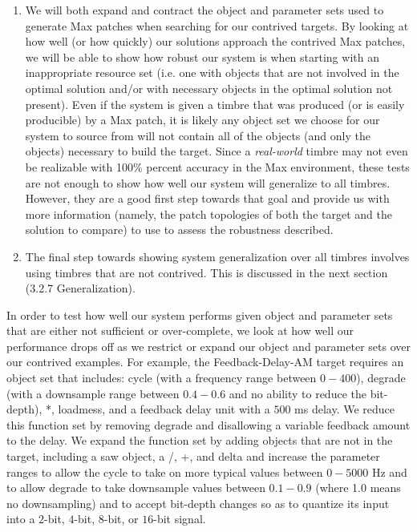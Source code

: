 \documentclass[a4paper,12pt]{report} 	%
\numberwithin{figure}{chapter}
\numberwithin{table}{chapter}
\numberwithin{equation}{chapter}
\begin{document}
\begin{flushleft}
\begin{enumerate}
\item We will both expand and contract the object and parameter sets used to generate Max patches when searching for our contrived targets. By looking at how well (or how quickly) our solutions approach the contrived Max patches, we will be able to show how robust our system is when starting with an inappropriate resource set (i.e. one with objects that are not involved in the optimal solution and/or with necessary objects in the optimal solution not present). Even if the system is given a timbre that was produced (or is easily producible) by a Max patch, it is likely any object set we choose for our system to source from will not contain all of the objects (and only the objects) necessary to build the target. Since a \emph{real-world} timbre may not even be realizable with 100\% percent accuracy in the Max environment, these tests are not enough to show how well our system will generalize to all timbres. However, they are a good first step towards that goal and provide us with more information (namely, the patch topologies of both the target and the solution to compare) to use to assess the robustness described.
\item The final step towards showing system generalization over all timbres involves using timbres that are not contrived. This is discussed in the next section (3.2.7 Generalization).
\end{enumerate}

In order to test how well our system performs given object and parameter sets that are either not sufficient or over-complete, we look at how well our performance drops off as we restrict or expand our object and parameter sets over our contrived examples. For example, the Feedback-Delay-AM target requires an object set that includes: cycle\texttildelow{} (with a frequency range between $0-400$), degrade\texttildelow{} (with a downsample range between $0.4 - 0.6$ and no ability to reduce the bit-depth), *\texttildelow{}, loadmess, and a feedback delay unit with a $500$ ms delay. We reduce this function set by removing degrade\texttildelow{} and disallowing a variable feedback amount to the delay. We expand the function set by adding objects that are not in the target, including a saw\texttildelow{} object, a /\texttildelow{}, +\texttildelow{}, and delta\texttildelow{} and increase the parameter ranges to allow the cycle\texttildelow{}  to take on more typical values between $0-5000$ Hz and to allow degrade\texttildelow{}  to take downsample values between $0.1-0.9$ (where 1.0 means no downsampling) and to accept bit-depth changes so as to quantize its input into a $2$-bit, $4$-bit, $8$-bit, or $16$-bit signal. 


\end{flushleft}
\end{document}
